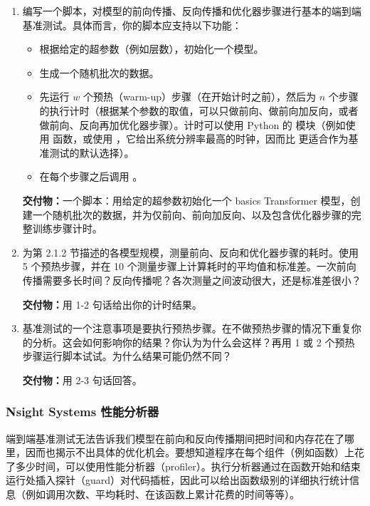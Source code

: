 \begin{enumerate}[label=(\alph*)]
  \item 编写一个脚本，对模型的前向传播、反向传播和优化器步骤进行基本的端到端基准测试。具体而言，你的脚本应支持以下功能：
  \begin{itemize}
    \item 根据给定的超参数（例如层数），初始化一个模型。
    \item 生成一个随机批次的数据。
    \item 先运行 $w$ 个预热（warm-up）步骤（在开始计时之前），然后为 $n$ 个步骤的执行计时（根据某个参数的取值，可以只做前向、做前向加反向，或者做前向、反向再加优化器步骤）。计时可以使用 Python 的  模块（例如使用  函数，或使用 ，它给出系统分辨率最高的时钟，因而比  更适合作为基准测试的默认选择）。
    \item 在每个步骤之后调用 。
  \end{itemize}
  \textbf{交付物：}一个脚本：用给定的超参数初始化一个 basics Transformer 模型，创建一个随机批次的数据，并为仅前向、前向加反向、以及包含优化器步骤的完整训练步骤计时。

  \item 为第 2.1.2 节描述的各模型规模，测量前向、反向和优化器步骤的耗时。使用 5 个预热步骤，并在 10 个测量步骤上计算耗时的平均值和标准差。一次前向传播需要多长时间？反向传播呢？各次测量之间波动很大，还是标准差很小？

  \textbf{交付物：}用 1-2 句话给出你的计时结果。

  \item 基准测试的一个注意事项是要执行预热步骤。在不做预热步骤的情况下重复你的分析。这会如何影响你的结果？你认为为什么会这样？再用 1 或 2 个预热步骤运行脚本试试。为什么结果可能仍然不同？

  \textbf{交付物：}用 2-3 句话回答。
\end{enumerate}

\subsubsection{Nsight Systems 性能分析器}

端到端基准测试无法告诉我们模型在前向和反向传播期间把时间和内存花在了哪里，因而也揭示不出具体的优化机会。要想知道程序在每个组件（例如函数）上花了多少时间，可以使用性能分析器（profiler）。执行分析器通过在函数开始和结束运行处插入探针（guard）对代码插桩，因此可以给出函数级别的详细执行统计信息（例如调用次数、平均耗时、在该函数上累计花费的时间等等）。

